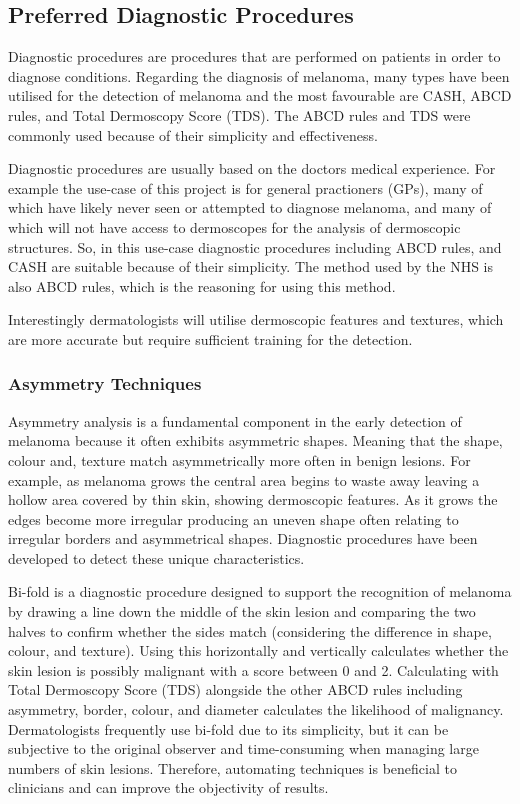 
\subsection{Preferred Diagnostic Procedures}
Diagnostic procedures are procedures that are performed on patients in order to diagnose conditions. Regarding the diagnosis of melanoma, many types have been utilised for the detection of melanoma and the most favourable are CASH, ABCD rules, and Total Dermoscopy Score (TDS). The ABCD rules and TDS were commonly used because of their simplicity and effectiveness.

Diagnostic procedures are usually based on the doctors medical experience. For example the use-case of this project is for general practioners (GPs), many of which have likely never seen or attempted to diagnose melanoma, and many of which will not have access to dermoscopes for the analysis of dermoscopic structures. So, in this use-case diagnostic procedures including ABCD rules, and CASH are suitable because of their simplicity. The method used by the NHS is also ABCD rules, which is the reasoning for using this method. 

Interestingly dermatologists will utilise dermoscopic features and textures, which are more accurate but require sufficient training for the detection.

\subsubsection{Asymmetry Techniques}
Asymmetry analysis is a fundamental component in the early detection of melanoma because it often exhibits asymmetric shapes\cite{Ali2020a}. Meaning that the shape, colour and, texture match asymmetrically more often in benign lesions. For example, as melanoma grows the central area begins to waste away leaving a hollow area covered by thin skin, showing dermoscopic features. As it grows the edges become more irregular producing an uneven shape often relating to irregular borders and asymmetrical shapes. Diagnostic procedures have been developed to detect these unique characteristics.

Bi-fold is a diagnostic procedure designed to support the recognition of melanoma by drawing a line down the middle of the skin lesion and comparing the two halves to confirm whether the sides match (considering the difference in shape, colour, and texture). Using this horizontally and vertically calculates whether the skin lesion is possibly malignant with a score between 0 and 2. Calculating with Total Dermoscopy Score (TDS) alongside the other ABCD rules including asymmetry, border, colour, and diameter calculates the likelihood of malignancy. Dermatologists frequently use bi-fold due to its simplicity, but it can be subjective to the original observer and time-consuming when managing large numbers of skin lesions. Therefore, automating techniques is beneficial to clinicians and can improve the objectivity of results.


